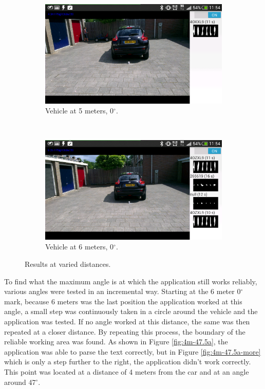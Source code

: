 \begin{figure}[ht]
        \begin{subfigure}{0.5\textwidth}
            \includegraphics[width=\textwidth]{plaatjes/test-5m-0a}
            \caption{Vehicle at 5 meters, 0$^{\circ}$.}
            \label{fig:5m-0a}
        \end{subfigure}%
        ~
        \begin{subfigure}{0.5\textwidth}
            \includegraphics[width=\textwidth]{plaatjes/test-6m-0a}
            \caption{Vehicle at 6 meters, 0$^{\circ}$.}
            \label{fig:6m-0a}
        \end{subfigure}%

        \caption{Results at varied distances.}
        \label{fig:distance-test}
\end{figure} %


To find what the maximum angle is at which the application still works reliably, various angles were tested in an incremental way. Starting at the 6 meter 0$^{\circ}$ mark, because 6 meters was the last position the application worked at this angle, a small step was continuously taken in a circle around the vehicle and the application was tested. If no angle worked at this distance, the same was then repeated at a closer distance. By repeating this process, the boundary of the reliable working area was found. As shown in Figure \ref{fig:4m-47.5a}, the application was able to parse the text correctly, but in Figure \ref{fig:4m-47.5a-more} which is only a step further to the right, the application didn't work correctly. This point was located at a distance of 4 meters from the car and at an angle around 47$^{\circ}$.

